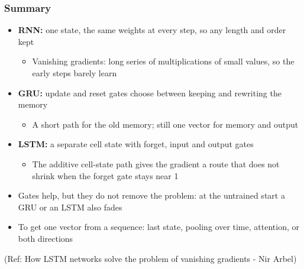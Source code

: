 \begin{frame}[fragile] \frametitle{Summary}
\begin{itemize}
\item \textbf{RNN:} one state, the same weights at every step, so any length and order kept
  \begin{itemize}
  \item Vanishing gradients: long series of multiplications of small values, so the early steps barely learn
  \end{itemize}
\item \textbf{GRU:} update and reset gates choose between keeping and rewriting the memory
  \begin{itemize}
  \item A short path for the old memory; still one vector for memory and output
  \end{itemize}
\item \textbf{LSTM:} a separate cell state with forget, input and output gates
  \begin{itemize}
  \item The additive cell-state path gives the gradient a route that does not shrink when the forget gate stays near 1
  \end{itemize}
\item Gates help, but they do not remove the problem: at the untrained start a GRU or an LSTM also fades
\item To get one vector from a sequence: last state, pooling over time, attention, or both directions
\end{itemize}

{\tiny (Ref: How LSTM networks solve the problem of vanishing gradients
- Nir Arbel)}

\end{frame}
